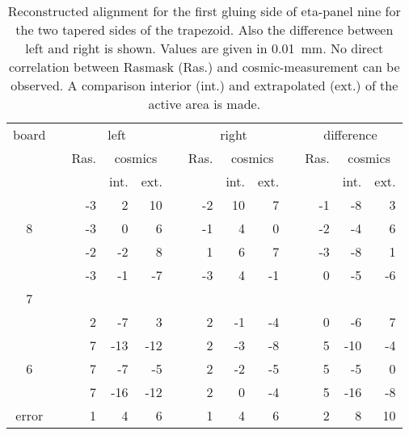 \documentclass[
twoside,            %
BCOR1.4cm,          %
10pt,               %
headings=normal,    %
headsepline,        %
clearplainpage,		%
final,              %
div=14,
open=right,
bibliography=toc
]{scrreprt}
\begin{document}
\begin{table}[!h]
	\centering	
		\begin{tabular}{ccrrrcrrrcrrr}
		\hline
		\hline
		board & \hspace{1mm} & \multicolumn{3}{c}{left} & \hspace{1mm} & \multicolumn{3}{c}{right} & \hspace{1mm} & \multicolumn{3}{c}{difference}
		\\
		 & & Ras. & \multicolumn{2}{c}{cosmics} & & Ras. & \multicolumn{2}{c}{cosmics} & & Ras. & \multicolumn{2}{c}{cosmics}
		\\
	 	 & &       & int. & ext. & &      & int. & ext. & &      & int. & ext.
 		\\
		\hline
		  & &   -3 &    2 &   10 & &   -2 &   10 &    7 & &   -1 &   -8 &    3
		\\
		8 & &   -3 &    0 &    6 & &   -1 &    4 &    0 & &   -2 &   -4 &    6
		\\
		  & &   -2 &   -2 &    8 & &    1 &    6 &    7 & &   -3 &   -8 &    1
		\\
		\hline
		  & &   -3 &   -1 &   -7 & &   -3 &    4 &   -1 & &    0 &   -5 &   -6
		\\
		7 & &      &      &      & &      &      &      & &      &      &     
		\\
		  & &    2 &   -7 &    3 & &    2 &   -1 &   -4 & &    0 &   -6 &    7
		\\
		\hline
		  & &    7 &  -13 &  -12 & &    2 &   -3 &   -8 & &    5 &  -10 &   -4
		\\
		6 & &    7 &   -7 &   -5 & &    2 &   -2 &   -5 & &    5 &   -5 &    0
		\\
		  & &    7 &  -16 &  -12 & &    2 &    0 &   -4 & &    5 &  -16 &   -8
 		\\
	 	\hline
	 	error & & 1 & 4 & 6 & & 1 & 4 & 6 & & 2 & 8 & 10
 		\\
	 	\hline
		\hline
	\end{tabular}
	\caption{
		Reconstructed alignment for the first gluing side of eta-panel nine for the two tapered sides of the trapezoid.
		Also the difference between left and right is shown.
		Values are given in \SI{0.01}{mm}.
		No direct correlation between Rasmask (Ras.) and cosmic-measurement can be observed.
		A comparison interior (int.) and extrapolated (ext.) of the active area is made.
	}
	\label{eta9gs1alignment}
	\vspace{-5mm}
\end{table}
\end{document}
